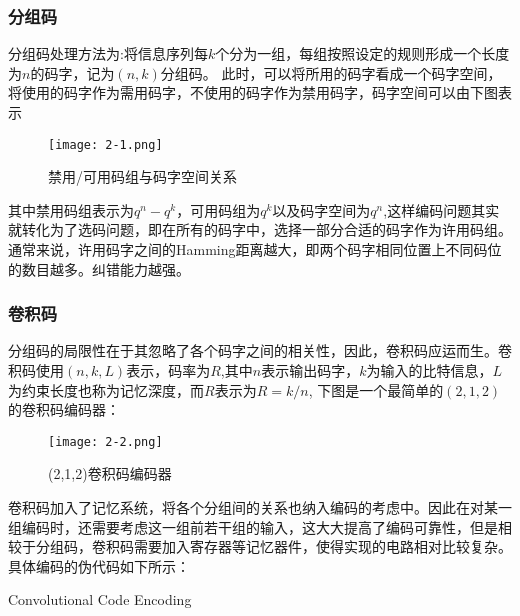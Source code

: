 \documentclass{article}
\begin{document}
\subsubsection{分组码}
分组码处理方法为:将信息序列每$k$个分为一组，每组按照设定的规则形成一个长度为$n$的码字，记为$(n,k)$分组码。
此时，可以将所用的码字看成一个码字空间，将使用的码字作为需用码字，不使用的码字作为禁用码字，码字空间可以由下图表示

\begin{figure}[h]
  \centering
  \texttt{[image: 2-1.png]}
  \caption{禁用/可用码组与码字空间关系}
\end{figure}
其中禁用码组表示为$q^n-q^k$，可用码组为$q^k$以及码字空间为$q^n$,这样编码问题其实就转化为了选码问题，即在所有的码字中，选择一部分合适的码字作为许用码组。通常来说，许用码字之间的Hamming距离越大，即两个码字相同位置上不同码位的数目越多。纠错能力越强。

\subsubsection{卷积码}
分组码的局限性在于其忽略了各个码字之间的相关性，因此，卷积码应运而生。卷积码使用$(n, k, L)$表示，码率为$R$,其中$n$表示输出码字，$k$为输入的比特信息，$L$为约束长度也称为记忆深度，而$R$表示为$R = k/n$, 下图是一个最简单的$(2,1,2)$的卷积码编码器：

\begin{figure}[h]
  \centering
  \texttt{[image: 2-2.png]}
  \caption{(2,1,2)卷积码编码器}
\end{figure}

卷积码加入了记忆系统，将各个分组间的关系也纳入编码的考虑中。因此在对某一组编码时，还需要考虑这一组前若干组的输入，这大大提高了编码可靠性，但是相较于分组码，卷积码需要加入寄存器等记忆器件，使得实现的电路相对比较复杂。具体编码的伪代码如下所示：

\begin{algorithm}[H]
  \SetAlgoLined
  
  
  \BlankLine
  
  \caption{Convolutional Code Encoding}
  
  \BlankLine
  
  
\end{algorithm}
\end{document}
